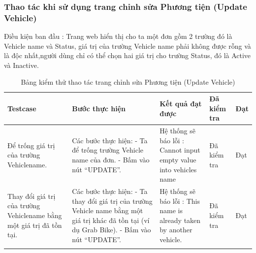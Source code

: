 \documentclass{article}
\begin{document}
\subsubsection{Thao tác khi sử dụng trang chỉnh sửa Phương tiện (Update Vehicle) }
Điều kiện ban đầu : Trang web hiển thị cho ta một đơn gồm 2 trường đó là Vehicle name và Status, giá trị của trường Vehicle name phải không được rỗng và là độc nhất,người dùng chỉ có thể chọn hai giá trị cho trường Status, đó là Active và Inactive.  \newline
\begin{longtable}{ | p{} |p{} | p{}  | p{}  | p{}  | } 
\hline
\textbf{Testcase}& \textbf{Bước thực hiện}& \textbf{Kết quả đạt được} & \textbf{Đã kiểm tra}& \textbf{Đạt} \\ 
\hline
\hline
Để trống giá trị của trường Vehiclename.  
&
Các bước thực hiện: \newline
- Ta để trống trường Vehicle name của đơn. \newline
- Bấm vào nút “UPDATE”.
&
Hệ thống sẽ báo lỗi : Cannot input empty value into vehicles name
&
Đã kiểm tra &
Đạt \\

\hline
Thay đổi giá trị của trường Vehiclename bằng một giá trị đã tồn tại.  
&
Các bước thực hiện: \newline
- Ta thay đổi giá trị của trường Vehicle name bằng một giá trị khác đã tồn tại (ví dụ Grab Bike). \newline
- Bấm vào nút “UPDATE”.
&
Hệ thống sẽ báo lỗi : This name is already taken by another vehicle.
&
Đã kiểm tra &
Đạt \\

\hline
\caption{Bảng kiểm thử thao tác trang chỉnh sửa Phương tiện (Update Vehicle)}
\end{longtable}

\end{document}

